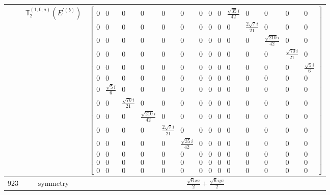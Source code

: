 \documentclass[fleqn,8pt,landscape]{jsarticle}
\begin{document}
\begin{longtable}{ccc}
$  $ & $ \mathbb{T}_{2}^{(1,0;a)}(E^{\prime(b)}) $ & $ \begin{bmatrix} 0 & 0 & 0 & 0 & 0 & 0 & 0 & 0 & 0 & \frac{\sqrt{35} i}{42} & 0 & 0 & 0 & 0 \\ 0 & 0 & 0 & 0 & 0 & 0 & 0 & 0 & 0 & 0 & \frac{2 \sqrt{7} i}{21} & 0 & 0 & 0 \\ 0 & 0 & 0 & 0 & 0 & 0 & 0 & 0 & 0 & 0 & 0 & \frac{\sqrt{210} i}{42} & 0 & 0 \\ 0 & 0 & 0 & 0 & 0 & 0 & 0 & 0 & 0 & 0 & 0 & 0 & \frac{\sqrt{70} i}{21} & 0 \\ 0 & 0 & 0 & 0 & 0 & 0 & 0 & 0 & 0 & 0 & 0 & 0 & 0 & \frac{\sqrt{5} i}{6} \\ 0 & 0 & 0 & 0 & 0 & 0 & 0 & 0 & 0 & 0 & 0 & 0 & 0 & 0 \\ 0 & \frac{\sqrt{5} i}{6} & 0 & 0 & 0 & 0 & 0 & 0 & 0 & 0 & 0 & 0 & 0 & 0 \\ 0 & 0 & \frac{\sqrt{70} i}{21} & 0 & 0 & 0 & 0 & 0 & 0 & 0 & 0 & 0 & 0 & 0 \\ 0 & 0 & 0 & \frac{\sqrt{210} i}{42} & 0 & 0 & 0 & 0 & 0 & 0 & 0 & 0 & 0 & 0 \\ 0 & 0 & 0 & 0 & \frac{2 \sqrt{7} i}{21} & 0 & 0 & 0 & 0 & 0 & 0 & 0 & 0 & 0 \\ 0 & 0 & 0 & 0 & 0 & \frac{\sqrt{35} i}{42} & 0 & 0 & 0 & 0 & 0 & 0 & 0 & 0 \\ 0 & 0 & 0 & 0 & 0 & 0 & 0 & 0 & 0 & 0 & 0 & 0 & 0 & 0 \\ 0 & 0 & 0 & 0 & 0 & 0 & 0 & 0 & 0 & 0 & 0 & 0 & 0 & 0 \\ 0 & 0 & 0 & 0 & 0 & 0 & 0 & 0 & 0 & 0 & 0 & 0 & 0 & 0 \end{bmatrix} $ \\ \hline
$ 923 $ & $ \text{symmetry} $ & $ \frac{\sqrt{6} x z}{2} + \frac{\sqrt{6} i y z}{2} $ \\

\end{longtable}
\end{document}
